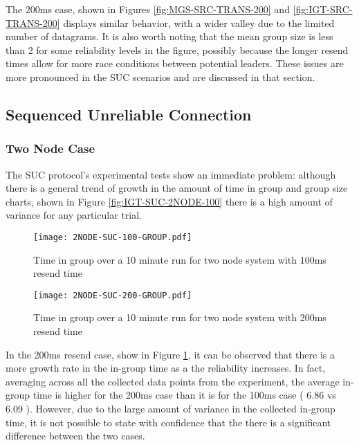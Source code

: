 The 200ms case, shown in Figures \ref{fig:MGS-SRC-TRANS-200} and \ref{fig:IGT-SRC-TRANS-200} displays similar behavior, with a wider valley due to the
limited number of datagrams. It is also worth noting that the mean group
size is less than 2 for some reliability levels in the figure, possibly because the longer resend times allow
for more race conditions between potential leaders. These issues are more pronounced in the SUC scenarios and
are discussed in that section. 

\subsection{Sequenced Unreliable Connection}

\subsubsection{Two Node Case}

The SUC protocol's experimental tests show an immediate problem: although there
is a general trend of growth in the amount of time in group and group size
charts, shown in Figure \ref{fig:IGT-SUC-2NODE-100}
there is a high amount of variance for any particular trial.

\begin{figure}
\centering
\begin{minipage}{0.45\textwidth}
    \centering
    \texttt{[image: 2NODE-SUC-100-GROUP.pdf]}
    \caption{Time in group over a 10 minute run for two node system with 100ms resend time}
    \label{fig:IGT-SUC-2NODE-100}
\end{minipage}%
\qquad
\begin{minipage}{0.45\textwidth}
    \centering
    \texttt{[image: 2NODE-SUC-200-GROUP.pdf]}
    \caption{Time in group over a 10 minute run for two node system with 200ms resend time}
    \label{fig:IGT-SUC-2NODE-200}
\end{minipage}
\end{figure}

In the 200ms resend case, show in Figure \ref{fig:IGT-SUC-2NODE-200}, it can be
observed that there is a more growth rate in the in-group time as a the
reliability increases. In fact, averaging across all the collected data points
from the experiment, the average in-group time is higher for the 200ms case
than it is for the 100ms case ( 6.86 vs 6.09 ). However, due to the large amount
of variance in the collected in-group time, it is not possible to state with
confidence that the there is a significant difference between the two cases.

